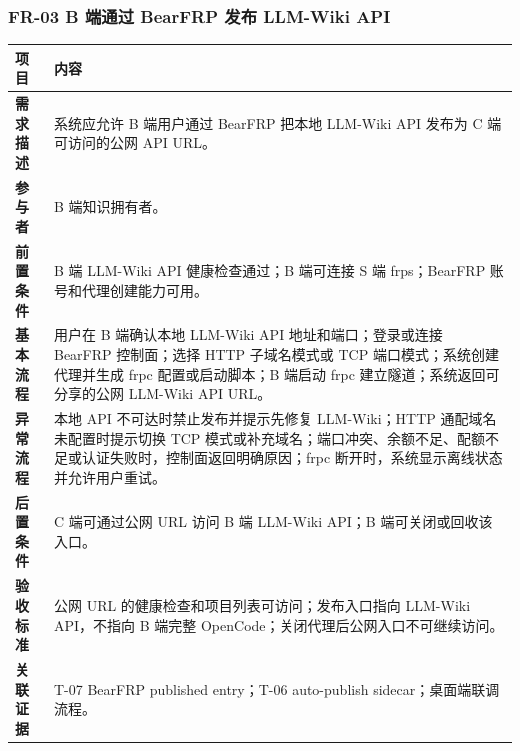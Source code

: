 \documentclass[UTF8,a4paper,12pt,fontset=fandol]{ctexart}
\begin{document}
\subsubsection{FR-03 B 端通过 BearFRP 发布 LLM-Wiki API}
\begin{longtable}{>{\bfseries}p{2.4cm}p{11.8cm}}
\toprule
项目 & 内容 \\
\midrule
需求描述 & 系统应允许 B 端用户通过 BearFRP 把本地 LLM-Wiki API 发布为 C 端可访问的公网 API URL。 \\
参与者 & B 端知识拥有者。 \\
前置条件 & B 端 LLM-Wiki API 健康检查通过；B 端可连接 S 端 frps；BearFRP 账号和代理创建能力可用。 \\
基本流程 & 用户在 B 端确认本地 LLM-Wiki API 地址和端口；登录或连接 BearFRP 控制面；选择 HTTP 子域名模式或 TCP 端口模式；系统创建代理并生成 frpc 配置或启动脚本；B 端启动 frpc 建立隧道；系统返回可分享的公网 LLM-Wiki API URL。 \\
异常流程 & 本地 API 不可达时禁止发布并提示先修复 LLM-Wiki；HTTP 通配域名未配置时提示切换 TCP 模式或补充域名；端口冲突、余额不足、配额不足或认证失败时，控制面返回明确原因；frpc 断开时，系统显示离线状态并允许用户重试。 \\
后置条件 & C 端可通过公网 URL 访问 B 端 LLM-Wiki API；B 端可关闭或回收该入口。 \\
验收标准 & 公网 URL 的健康检查和项目列表可访问；发布入口指向 LLM-Wiki API，不指向 B 端完整 OpenCode；关闭代理后公网入口不可继续访问。 \\
关联证据 & T-07 BearFRP published entry；T-06 auto-publish sidecar；桌面端联调流程。 \\
\bottomrule
\end{longtable}
\end{document}
